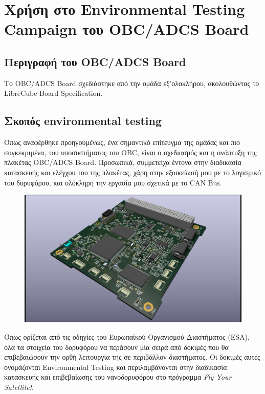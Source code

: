 \documentclass[a4paper,nobib,justified]{tufte-book}
\begin{document}
\section{Χρήση στο Environmental Testing Campaign του OBC/ADCS Board}
	\subsection{Περιγραφή του OBC/ADCS Board}
	Το OBC/ADCS Board σχεδιάστηκε από την ομάδα εξ'ολοκλήρου, ακολουθώντας το LibreCube Board Specification. %

	\subsection{Σκοπός environmental testing}
	Όπως αναφέρθηκε προηγουμένως, ένα σημαντικό επίτευγμα της ομάδας και πιο συγκεκριμένα, του υποσυστήματος του OBC, είναι ο σχεδιασμός και η ανάπτυξη της πλακέτας OBC/ADCS Board. Προσωπικά, συμμετείχα έντονα στην διαδικασία κατασκευής και ελέγχου του της πλακέτας, χάρη στην εξοικείωσή μου με το λογισμικό του δορυφόρου, και ολόκληρη την εργασία μου σχετικά με το CAN Bus.

	\begin{figure}[h]
		\includegraphics{media/images/obc-adcs-board.jpg}
	\end{figure}

	\par Όπως ορίζεται από τις οδηγίες του Ευρωπαϊκού Οργανισμού Διαστήματος (ESA), όλα τα στοιχεία του δορυφόρου να περάσουν μία σειρά από δοκιμές που θα επιβεβαιώσουν την ορθή λειτουργία της σε περιβάλλον διαστήματος. Οι δοκιμές αυτές ονομάζονται Environmental Testing και περιλαμβάνονται στην διαδικασία κατασκευής και επιβεβαίωσης του νανοδορυφόρου στο πρόγραμμα \textit{Fly Your Satellite!}.
\end{document}
